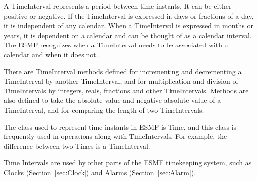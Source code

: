 
A TimeInterval represents a period between time instants.  
It can be either positive or negative.  If the TimeInterval 
is expressed in days or fractions of a day, it is independent of any 
calendar.  When a TimeInterval is expressed in months or years, 
it is dependent on a calendar and can be thought of as a calendar 
interval.  The ESMF recognizes when a TimeInterval needs to be 
associated with a calendar and when it does not.

There are TimeInterval methods defined for incrementing and
decrementing a TimeInterval by another TimeInterval,
and for multiplication and division of TimeIntervals by integers, 
reals, fractions and other TimeIntervals.  Methods are also 
defined to take the absolute value and negative absolute value of a 
TimeInterval, and for comparing the length of two
TimeIntervals.

The class used to represent time instants in ESMF is Time,
and this class is frequently used in operations along with 
TimeIntervals.  For example, the difference between two
Times is a TimeInterval.  

Time Intervals are used by other parts of the ESMF timekeeping
system, such as Clocks (Section~\ref{sec:Clock}) and Alarms 
(Section~\ref{sec:Alarm}).    





